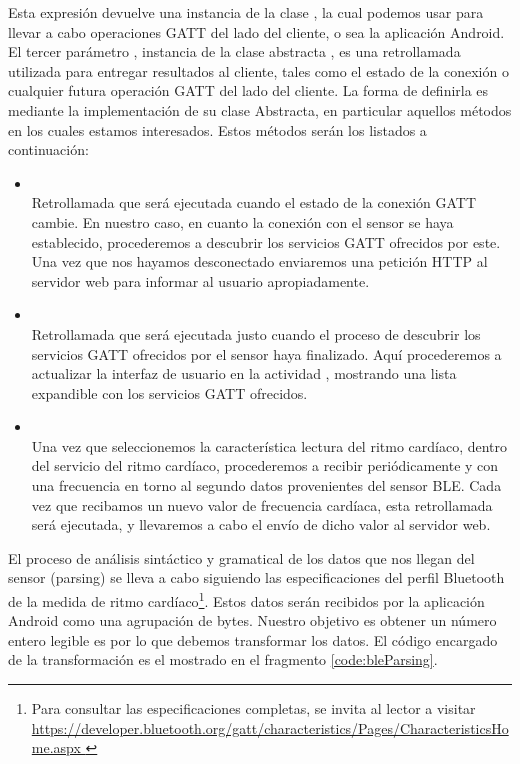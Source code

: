 Esta expresión devuelve una instancia de la clase , la cual podemos usar para llevar a cabo operaciones GATT del lado del cliente, o sea la aplicación Android. El tercer parámetro , instancia de la clase abstracta , es una retrollamada utilizada para entregar resultados al cliente, tales como el estado de la conexión o cualquier futura operación GATT del lado del cliente. La forma de definirla es mediante la implementación de su clase Abstracta, en particular aquellos métodos en los cuales estamos interesados. Estos métodos serán los listados a continuación:
\begin{itemize}
	\item {} \\
	Retrollamada que será ejecutada cuando el estado de la conexión GATT cambie. En nuestro caso, en cuanto la conexión con el sensor se haya establecido, procederemos a descubrir los servicios GATT ofrecidos por este. Una vez que nos hayamos desconectado enviaremos una petición HTTP al servidor web para informar al usuario apropiadamente.
	
	\item {} \\
	Retrollamada que será ejecutada justo cuando el proceso de descubrir los servicios GATT ofrecidos por el sensor haya finalizado. Aquí procederemos a actualizar la interfaz de usuario en la actividad , mostrando una lista expandible con los servicios GATT ofrecidos.
	
	\item {} \\
	Una vez que seleccionemos la característica lectura del ritmo cardíaco, dentro del servicio del ritmo cardíaco, procederemos a recibir periódicamente y con una frecuencia en torno al segundo datos provenientes del sensor BLE. Cada vez que recibamos un nuevo valor de frecuencia cardíaca, esta retrollamada será ejecutada, y llevaremos a cabo el envío de dicho valor al servidor web.
\end{itemize}

El proceso de análisis sintáctico y gramatical de los datos que nos llegan del sensor (parsing) se lleva a cabo siguiendo las especificaciones del perfil Bluetooth de la medida de ritmo cardíaco\footnote{Para consultar las especificaciones completas, se invita al lector a visitar \mbox{\url{https://developer.bluetooth.org/gatt/characteristics/Pages/CharacteristicsHome.aspx }}}. Estos datos serán recibidos por la aplicación Android como una agrupación de bytes. Nuestro objetivo es obtener un número entero legible es por lo que debemos transformar  los datos. El código encargado de la transformación es el mostrado en el fragmento \ref{code:bleParsing}.

